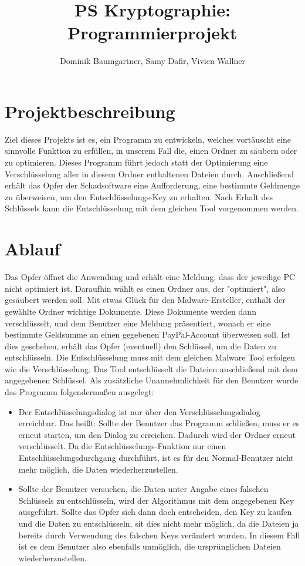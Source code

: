 \documentclass[12pt, a4paper]{article}
\title{PS Kryptographie: Programmierprojekt}
\author{Dominik Baumgartner, Samy Dafir, Vivien Wallner}
\date{}
\begin{document}
	\maketitle
	
\section{Projektbeschreibung}
Ziel dieses Projekts ist es, ein Programm zu entwickeln, welches vortäuscht eine sinnvolle Funktion zu erfüllen, in unserem Fall die, einen Ordner zu säubern oder zu optimieren. Dieses Programm führt jedoch statt der Optimierung eine Verschlüsselung aller in diesem Ordner enthaltenen Dateien durch. Anschließend erhält das Opfer der Schadsoftware eine Aufforderung, eine bestimmte Geldmenge zu überweisen, um den Entschlüsselungs-Key zu erhalten. Nach Erhalt des Schlüssels kann die Entschlüsselung mit dem gleichen Tool vorgenommen werden.

\section{Ablauf}
Das Opfer öffnet die Anwendung und erhält eine Meldung, dass der jeweilige PC nicht optimiert ist. Daraufhin wählt es einen Ordner aus, der "optimiert", also gesäubert werden soll. Mit etwas Glück für den Malware-Ersteller, enthält der gewählte Ordner wichtige Dokumente. Diese Dokumente werden dann verschlüsselt, und dem Benutzer eine Meldung präsentiert, wonach er eine bestimmte Geldsumme an einen gegebenen PayPal-Account überweisen soll. Ist dies geschehen, erhält das Opfer (eventuell) den Schlüssel, um die Daten zu entschlüsseln. Die Entschlüsselung muss mit dem gleichen Malware Tool erfolgen wie die Verschlüsselung. Das Tool entschlüsselt die Dateien anschließend mit dem angegebenen Schlüssel. Als zusätzliche Unannehmlichkeit für den Benutzer wurde das Programm folgendermaßen ausgelegt:
\begin{itemize}
	\item Der Entschlüsselungsdialog ist nur über den Verschlüsselungsdialog erreichbar. Das heißt: Sollte der Benutzer das Programm schließen, muss er es erneut starten, um den Dialog zu erreichen. Dadurch wird der Ordner erneut verschlüsselt. Da die Entschlüsselungs-Funktion nur einen Entschlüsselungsdurchgang durchführt, ist es für den Normal-Benutzer nicht mehr möglich, die Daten wiederherzustellen.
	\item Sollte der Benutzer versuchen, die Daten unter Angabe eines falschen Schlüssels zu entschlüsseln, wird der Algorithmus mit dem angegebenen Key ausgeführt. Sollte das Opfer sich dann doch entscheiden, den Key zu kaufen und die Daten zu entschlüsseln, sit dies nicht mehr möglich, da die Dateien ja bereits durch Verwendung des falschen Keys verändert wurden. In diesem Fall ist es dem Benutzer also ebenfalls unmöglich, die ursprünglichen Dateien wiederherzustellen.
\end{itemize}
\end{document}
